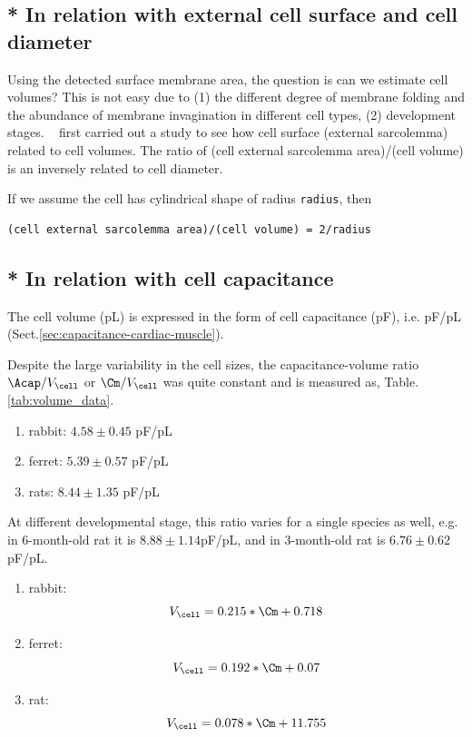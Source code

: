 \subsection{* In relation with external cell surface and cell diameter}

Using the detected surface membrane area, the question is can we estimate  cell
volumes? This is not easy due to (1) the different degree of membrane folding
and the abundance of membrane invagination in different cell types, (2)
development stages. ~\citep{satoh1996svr} first carried out a study to see how
cell surface (external sarcolemma) related to cell volumes. 
The ratio of (cell external sarcolemma area)/(cell volume) is an
inversely related to cell diameter. 

If we assume the cell has cylindrical shape of radius \verb!radius!,
then
\begin{verbatim}
(cell external sarcolemma area)/(cell volume) = 2/radius
\end{verbatim}

\subsection{* In relation with cell capacitance}

The cell volume (pL) is expressed in the form of cell capacitance (pF), i.e.
pF/pL (Sect.\ref{sec:capacitance-cardiac-muscle}). 

Despite the large variability in the cell sizes, the capacitance-volume ratio
$\Acap/V_\cell$ or $\Cm/V_\cell$ was quite constant and is measured as,
Table.\ref{tab:volume_data}.
\begin{enumerate}
\item rabbit: $4.58\pm0.45$ pF/pL
\item ferret: $5.39\pm 0.57$ pF/pL
\item rats: $8.44\pm 1.35$ pF/pL
\end{enumerate}

At different developmental stage, this ratio varies for a single
species as well, e.g. in 6-month-old rat it is $8.88\pm1.14$pF/pL, and
in 3-month-old rat is $6.76\pm0.62$ pF/pL.

\begin{enumerate}
\item rabbit:
  \begin{equation}
    \label{eq:1436}
    V_\cell = 0.215*\Cm + 0.718
  \end{equation}
\item ferret:
  \begin{equation}
    \label{eq:1437}
    V_\cell = 0.192*\Cm + 0.07
  \end{equation}
\item rat:
  \begin{equation}
    \label{eq:1438}
    V_\cell = 0.078*\Cm + 11.755
  \end{equation}
\end{enumerate}


